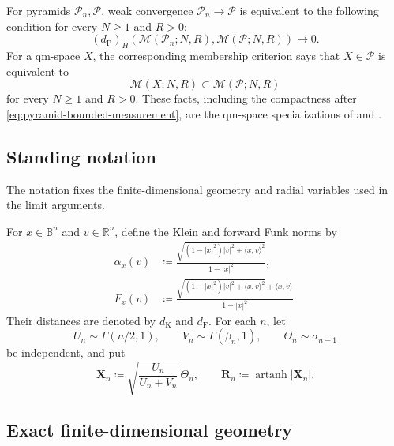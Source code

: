\documentclass{amsart}
\numberwithin{equation}{section}
\theoremstyle{plain}
\theoremstyle{definition}
\theoremstyle{remark}
\newcommand{\R}{\mathbb R}
\newcommand{\B}{\mathbb B}
\DeclareMathOperator{\artanh}{artanh}
\newcommand{\dF}{d_{\mathrm F}}
\newcommand{\dK}{d_{\mathrm K}}
\begin{document}
For pyramids $\mathcal P_n,\mathcal P$, weak convergence $\mathcal P_n\to\mathcal P$ is equivalent to the following condition for every $N\ge1$ and $R>0$:
\begin{equation}\label{eq:measurement-convergence-criterion} (d_{\mathrm P})_H(\mathcal M(\mathcal P_n;N,R),\mathcal M(\mathcal P;N,R))\longrightarrow0. \end{equation}
For a qm-space $X$, the corresponding membership criterion says that $X\in\mathcal P$ is equivalent to
\begin{equation}\label{eq:measurement-membership-criterion} \mathcal M(X;N,R)\subset\mathcal M(\mathcal P;N,R) \end{equation}
for every $N\ge1$ and $R>0$.
These facts, including the compactness after \eqref{eq:pyramid-bounded-measurement}, are the qm-space specializations of \cite[Theorem~4.4, Theorem~B.5, and Proposition~B.6]{gds3-ja} and \cite[Lemmas~3.12 and~3.14]{one-sided-pyramids}.

\subsection{Standing notation}

The notation fixes the finite-dimensional geometry and radial variables used in the limit arguments.

For $x\in\B^n$ and $v\in\R^n$, define the Klein and forward Funk norms by
\begin{align}
 \alpha_x(v)
 &\coloneqq\frac{\sqrt{(1-|x|^2)|v|^2+\langle x,v\rangle^2}}{1-|x|^2},
 \label{eq:klein-norm}\\
 F_x(v)
 &\coloneqq\frac{\sqrt{(1-|x|^2)|v|^2+\langle x,v\rangle^2}+\langle x,v\rangle}{1-|x|^2}.
 \label{eq:funk-norm}
\end{align}
Their distances are denoted by $\dK$ and $\dF$.
For each $n$, let
\[ U_n\sim\Gamma(n/2,1), \qquad V_n\sim\Gamma(\beta_n,1), \qquad \Theta_n\sim\sigma_{n-1} \]
be independent, and put
\[ \mathbf X_n\coloneqq\sqrt{\frac{U_n}{U_n+V_n}}\,\Theta_n, \qquad \mathbf R_n\coloneqq\artanh|\mathbf X_n|. \]

\subsection{Exact finite-dimensional geometry}
\end{document}
